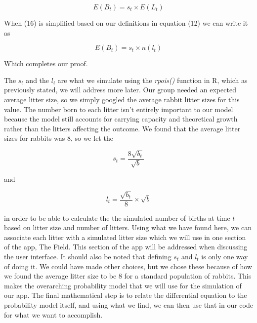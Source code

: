 \documentclass{article}\usepackage[]{graphicx}\usepackage[]{color}
\begin{document}
\begin{equation}
E(B_t) = s_t \times E(L_t)
\end{equation}

\noindent When (16) is simplified based on our definitions  in  equation (12) we can write it as

\begin{equation}
E(B_t) = s_t\times n(l_t)
\end{equation}

\noindent Which completes our proof. 

 The \(s_t\) and the \(l_t\) are what we simulate using the \textit{rpois()} function in R, which as previously stated, we will address more later. Our group needed an expected average litter size, so we simply googled the average rabbit litter sizes for this value. The number born to each litter isn't entirely important to our model because the model still accounts for carrying capacity and theoretical growth rather than the litters affecting the outcome. We found that the average litter sizes for rabbits was \(8\), so we let the 

\begin{equation}
s_t = \frac{8\sqrt{b_t}}{\sqrt{b}}
\end{equation}

and 

\begin{equation}
l_t = \frac{\sqrt{b_t}}{8}\times \sqrt{b}
\end{equation}

\noindent in order to be able to calculate the the simulated number of births at time \(t\) based on litter size and number of litters. Using what we have found here, we can associate each litter with a simulated litter size which we will use in one section of the app, The Field. This section of the app will be addressed when discussing the user interface. It should also be noted that defining \(s_t\) and \(l_t\) is only one way of doing it. We could have made other choices, but we chose these because of how we found the average litter size to be 8 for a standard population of rabbits. This makes the overarching probability model that we will use for the simulation of our app. The final mathematical step is to relate the differential equation to the probability model itself, and using what we find, we can then use that in our code for what we want to accomplish. 
\end{document}
